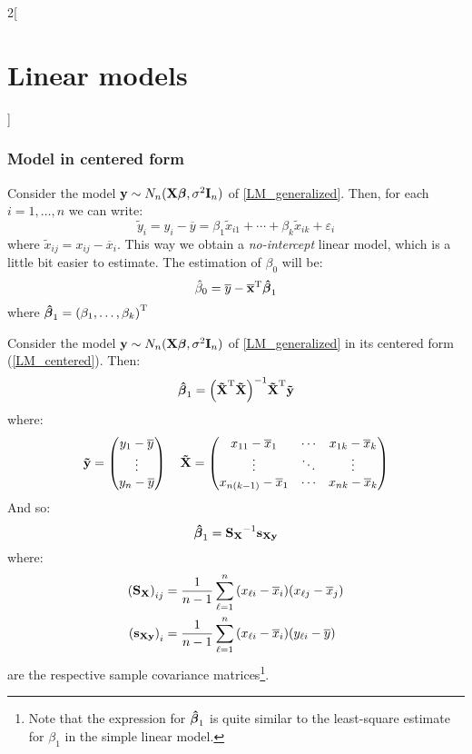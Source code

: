 \documentclass[../../../main_math.tex]{subfiles}
\begin{document}
\begin{multicols}{2}[\section{Linear models}]
  \subsubsection{Model in centered form}
  \begin{definition}
    Consider the model $\boldsymbol{\mathrm{y}}\sim N_n(\boldsymbol{\mathrm{X\beta}},\sigma^2\boldsymbol{\mathrm{I}}_n)$ of \cref{LM_generalized}. Then, for each $i=1,\ldots,n$ we can write:
    \begin{equation}\label{LM_centered}
      \tilde{y}_i=y_i-\overline{y}=\beta_1\tilde{x}_{i1}+\cdots+\beta_k\tilde{x}_{ik}+\varepsilon_i
    \end{equation}
    where $\tilde{x}_{ij}=x_{ij}-\overline{x}_i$. This way we obtain a \emph{no-intercept} linear model, which is a little bit easier to estimate. The estimation of $\beta_0$ will be: $$\hat{\beta}_0=\overline{y}-{\boldsymbol{\mathrm{\overline{x}}}}^{\mathrm{T}}\boldsymbol{\mathrm{\hat\beta}}_{1}$$ where $\boldsymbol{\mathrm{\hat{\beta}}}_1={(\beta_1,\ldots,\beta_k)}^{\mathrm{T}}$
  \end{definition}
  \begin{proposition}
    Consider the model $\boldsymbol{\mathrm{y}}\sim N_n(\boldsymbol{\mathrm{X\beta}},\sigma^2\boldsymbol{\mathrm{I}}_n)$ of \cref{LM_generalized} in its centered form (\cref{LM_centered}). Then: $$\boldsymbol{\mathrm{\hat\beta}}_{1}={\left({\boldsymbol{\mathrm{\tilde{X}}}}^{\mathrm{T}}\boldsymbol{\mathrm{\tilde{X}}}\right)}^{-1}{\boldsymbol{\mathrm{\tilde{X}}}}^{\mathrm{T}}\boldsymbol{\mathrm{\tilde{y}}}$$
    where: $$\boldsymbol{\mathrm{\tilde{y}}}=\begin{pmatrix}
        y_1  -\overline{y} \\
        \vdots             \\
        y_n -\overline{y}
      \end{pmatrix}\quad\boldsymbol{\mathrm{\tilde{X}}}=
      \begin{pmatrix}
        x_{11}-\overline{x}_1      & \cdots & x_{1k}-\overline{x}_k \\
        \vdots                     & \ddots & \vdots                \\
        x_{n(k-1)} -\overline{x}_1 & \cdots & x_{nk}-\overline{x}_k
      \end{pmatrix}$$
    And so: $$\boldsymbol{\mathrm{\hat\beta}}_{1}={\boldsymbol{\mathrm{S}}_{\boldsymbol{\mathrm{X}}}}^{-1}{\boldsymbol{\mathrm{s}}_{\boldsymbol{\mathrm{Xy}}}}$$ where:
    \begin{align*}
      {(\boldsymbol{\mathrm{S}}_{\boldsymbol{\mathrm{X}}})}_{ij} & =\frac{1}{n-1}\sum_{\ell=1}^n{(x_{\ell i}-\overline{x}_i)(x_{\ell j}-\overline{x}_j)} \\
      {(\boldsymbol{\mathrm{s}}_{\boldsymbol{\mathrm{Xy}}})}_i   & =\frac{1}{n-1}\sum_{\ell=1}^n{(x_{\ell i}-\overline{x}_i)(y_{\ell i}-\overline{y})}
    \end{align*}
    are the respective sample covariance matrices\footnote{Note that the expression for $\boldsymbol{\mathrm{\hat\beta}}_{1}$ is quite similar to the least-square estimate for $\beta_1$ in the simple linear model.}.
  \end{proposition}

\end{multicols}
\end{document}
